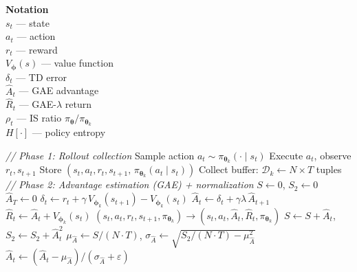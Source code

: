\documentclass[11pt]{article}
\begin{document}
\begin{algorithm}[p]
\begin{minipage}[t]{0.28\linewidth}
\vspace{6pt}
\textbf{Notation} \\[2pt]
$s_t$ --- state \\
$a_t$ --- action \\
$r_t$ --- reward \\
$V_{\boldsymbol{\phi}}(s)$ --- value function \\
$\delta_t$ --- TD error \\
$\hat{A}_t$ --- GAE advantage \\
$\hat{R}_t$ --- GAE-$\lambda$ return \\
$\rho_t$ --- IS ratio $\pi_{\boldsymbol{\theta}} / \pi_{\boldsymbol{\theta}_k}$ \\
$H[\cdot]$ --- policy entropy
\end{minipage}%
\hfill
\vrule
\hfill
\begin{minipage}[t]{0.68\linewidth}
\begin{algorithmic}[1]
    \Statex \hspace{\algorithmicindent}\textit{// Phase 1: Rollout collection}
            \State Sample action $a_t \sim \pi_{\boldsymbol{\theta}_k}(\cdot \mid s_t)$
            \State Execute $a_t$, observe $r_t, s_{t+1}$
            \State Store $(s_t, a_t, r_t, s_{t+1},\, \pi_{\boldsymbol{\theta}_k}(a_t \mid s_t))$
        \EndFor
    \EndFor
    \State Collect buffer: $\mathcal{D}_k \gets N \!\times\! T$ tuples
    \Statex \hspace{\algorithmicindent}\textit{// Phase 2: Advantage estimation (GAE) + normalization}
    \State $S \gets 0$, \; $S_2 \gets 0$
        \State $\hat{A}_T \gets 0$
            \State $\delta_t \gets r_t + \gamma\, V_{\boldsymbol{\phi}_k}(s_{t+1}) - V_{\boldsymbol{\phi}_k}(s_t)$
            \State $\hat{A}_t \gets \delta_t + \gamma \lambda\, \hat{A}_{t+1}$
            \State $\hat{R}_t \gets \hat{A}_t + V_{\boldsymbol{\phi}_k}(s_t)$
            \State $(s_t, a_t, r_t, s_{t+1}, \pi_{\boldsymbol{\theta}_k}) \!\to\! (s_t, a_t, \hat{A}_t, \hat{R}_t, \pi_{\boldsymbol{\theta}_k})$
            \State $S \gets S + \hat{A}_t$, \; $S_2 \gets S_2 + \hat{A}_t^2$
        \EndFor
    \EndFor
    \State $\mu_{\hat{A}} \gets S / (N \!\cdot\! T)$, \; $\sigma_{\hat{A}} \gets \sqrt{S_2 / (N \!\cdot\! T) - \mu_{\hat{A}}^2}$
        \State $\hat{A}_t \gets (\hat{A}_t - \mu_{\hat{A}}) / (\sigma_{\hat{A}} + \varepsilon)$

\end{algorithmic}
\end{minipage}
\end{algorithm}
\end{document}
